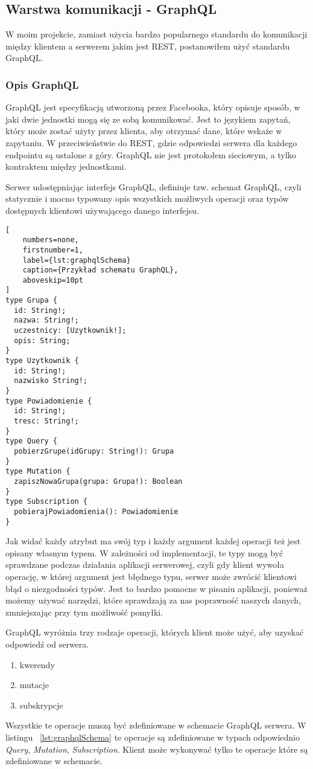 \subsection{Warstwa komunikacji - GraphQL}
W moim projekcie, zamiast użycia bardzo popularnego standardu do komunikacji między klientem a serwerem jakim jest REST, postanowiłem użyć standardu GraphQL.

\subsubsection{Opis GraphQL}
GraphQL jest specyfikacją utworzoną przez Facebooka, który opisuje sposób, w jaki dwie jednostki mogą się ze sobą komunikować. Jest to językiem zapytań, który może zostać użyty przez klienta, aby otrzymać dane, które wskaże w zapytaniu. W przeciwieństwie do REST, gdzie odpowiedzi serwera dla każdego endpointu są ustalone z góry. GraphQL nie jest protokołem sieciowym, a tylko kontraktem między jednostkami.

Serwer udostępniając interfejs GraphQL, definiuje tzw. schemat GraphQL, czyli statycznie i mocno typowany opis wszystkich możliwych operacji oraz typów dostępnych klientowi używającego danego interfejsu. 

\begin{addmargin}[6mm]{0mm}
\begin{lstlisting}[
    numbers=none,
    firstnumber=1,
    label={lst:graphqlSchema}
    caption={Przykład schematu GraphQL},
    aboveskip=10pt
]
type Grupa {
  id: String!;
  nazwa: String!;
  uczestnicy: [Uzytkownik!];
  opis: String;
}
type Uzytkownik {
  id: String!;
  nazwisko String!;
}
type Powiadomienie {
  id: String!;
  tresc: String!;
}
type Query {
  pobierzGrupe(idGrupy: String!): Grupa
}
type Mutation {
  zapiszNowaGrupa(grupa: Grupa!): Boolean
}
type Subscription {
  pobierajPowiadomienia(): Powiadomienie
}
\end{lstlisting}
\end{addmargin}
Jak widać każdy atrybut ma swój typ i każdy argument każdej operacji też jest opisany własnym typem. W zależności od implementacji, te typy mogą być sprawdzane podczas działania aplikacji serwerowej, czyli gdy klient wywoła operację, w której argument jest błędnego typu, serwer może zwrócić klientowi błąd o niezgodności typów. Jest to bardzo pomocne w pisaniu aplikacji, ponieważ możemy używać narzędzi, które sprawdzają za nas poprawność naszych danych, zmniejszając przy tym możliwość pomyłki.

GraphQL wyróżnia trzy rodzaje operacji, których klient może użyć, aby uzyskać odpowiedź od serwera.
\begin{enumerate}
  \item kwerendy 
  \item mutacje
  \item subskrypcje
\end{enumerate}
Wszystkie te operacje muszą być zdefiniowane w schemacie GraphQL serwera. W listingu ~\ref{lst:graphqlSchema} te operacje są zdefiniowane w typach odpowiednio \emph{Query}, \emph{Mutation}, \emph{Subscription}. Klient może wykonywać tylko te operacje które są zdefiniowane w schemacie.

